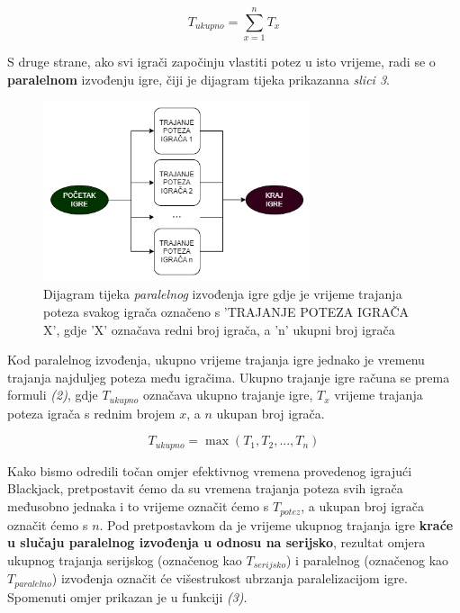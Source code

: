 \documentclass{IEEEcsmag}
\begin{document}
\begin{equation}
T_{ukupno} = \sum_{x=1}^{n} T_x
\end{equation}



S druge strane, ako svi igrači započinju vlastiti potez u isto vrijeme, radi se o \textbf{paralelnom} izvođenju igre, čiji je dijagram tijeka prikazan\break na \textit{slici 3}.

\begin{figure}[H]
\centerline{\includegraphics[width=18.5pc]{paralelnog-bijelo.png}}
\caption{Dijagram tijeka \textit{paralelnog} izvođenja igre gdje je vrijeme trajanja poteza svakog igrača označeno s 'TRAJANJE POTEZA IGRAČA X', gdje 'X' označava redni broj igrača, a 'n' ukupni broj igrača}
\vspace*{-5pt}
\end{figure}

Kod paralelnog izvođenja, ukupno vrijeme trajanja igre jednako je vremenu trajanja najduljeg poteza među igračima. Ukupno trajanje igre računa se prema formuli \textit{(2)}, gdje $T_{ukupno}$ označava ukupno trajanje igre, $T_x$ vrijeme trajanja poteza igrača s rednim brojem $x$, a $n$ ukupan broj igrača.

\begin{equation}
T_{ukupno} = \max{(T_1, T_2, ... , T_n)}
\end{equation}



Kako bismo odredili točan omjer efektivnog vremena provedenog igrajući Blackjack, pretpostavit ćemo da su vremena trajanja poteza svih igrača međusobno jednaka i to vrijeme označit ćemo s $T_{potez}$, a ukupan broj igrača označit ćemo s $n$. Pod pretpostavkom da je vrijeme ukupnog trajanja igre \textbf{kraće u slučaju paralelnog izvođenja u odnosu na serijsko}, rezultat omjera ukupnog trajanja serijskog (označenog kao $T_{serijsko}$) i paralelnog (označenog kao $T_{paralelno}$) izvođenja označit će višestrukost ubrzanja paralelizacijom igre. Spomenuti omjer prikazan je u funkciji \textit{(3)}.
\end{document}
